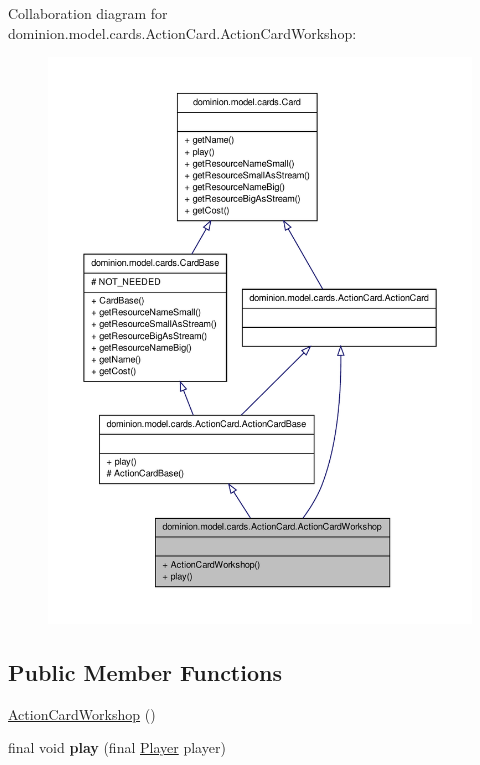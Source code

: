 \-Collaboration diagram for dominion.\-model.\-cards.\-Action\-Card.\-Action\-Card\-Workshop\-:
\nopagebreak
\begin{figure}[H]
\begin{center}
\leavevmode
\includegraphics[width=350pt]{classdominion_1_1model_1_1cards_1_1ActionCard_1_1ActionCardWorkshop__coll__graph}
\end{center}
\end{figure}
\subsection*{\-Public \-Member \-Functions}
\begin{DoxyCompactItemize}
\item 
\hyperlink{classdominion_1_1model_1_1cards_1_1ActionCard_1_1ActionCardWorkshop_a3f0a456c8dd94028b8de504fe7fe1b60}{\-Action\-Card\-Workshop} ()
\item 
\hypertarget{classdominion_1_1model_1_1cards_1_1ActionCard_1_1ActionCardWorkshop_ab01c3c8ac4dff9047e993351fca4255c}{final void {\bfseries play} (final \hyperlink{interfacedominion_1_1model_1_1Player}{\-Player} player)}\label{classdominion_1_1model_1_1cards_1_1ActionCard_1_1ActionCardWorkshop_ab01c3c8ac4dff9047e993351fca4255c}

\end{DoxyCompactItemize}


